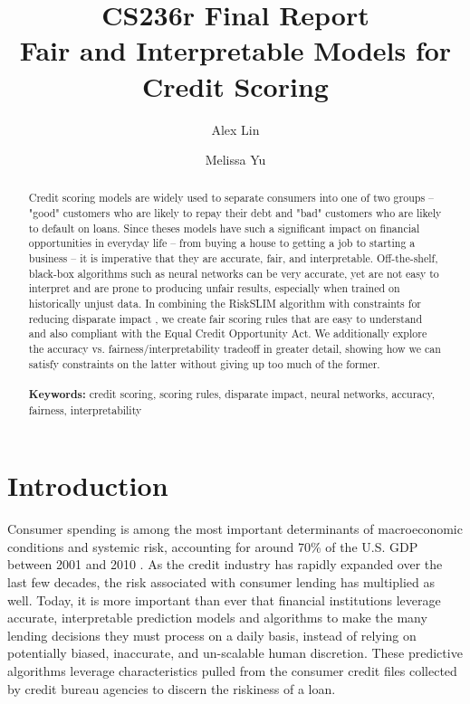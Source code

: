 \documentclass[11pt, margin=1in]{article}
\begin{document}
	
\title{CS236r Final Report \\ Fair and Interpretable Models for Credit Scoring}
\author{Alex Lin \and Melissa Yu}
\date{}
\maketitle

\begin{abstract}
Credit scoring models are widely used to separate consumers into one of two groups -- "good" customers who are likely to repay their debt and "bad" customers who are likely to default on loans.  Since theses models have such a significant impact on financial opportunities in everyday life -- from buying a house to getting a job to starting a business -- it is imperative that they are accurate, fair, and interpretable.  Off-the-shelf, black-box algorithms such as neural networks can be very accurate, yet are not easy to interpret and are prone to producing unfair results, especially when trained on historically unjust data.  In combining the RiskSLIM algorithm \cite{risk-slim} with constraints for reducing disparate impact \cite{disparate-impact}, we create fair scoring rules that are easy to understand and also compliant with the Equal Credit Opportunity Act.  We additionally explore the accuracy vs. fairness/interpretability tradeoff in greater detail, showing how we can satisfy constraints on the latter without giving up too much of the former. \\ \\  
\textbf{Keywords:} credit scoring, scoring rules, disparate impact, neural networks, accuracy, fairness, interpretability
\end{abstract}

\section{Introduction}
Consumer spending is among the most important determinants of macroeconomic conditions and systemic risk, accounting for around 70\% of the U.S. GDP between 2001 and 2010 \cite{ml-for-risk}. As the credit industry has rapidly expanded over the last few decades, the risk associated with consumer lending has multiplied as well. Today, it is more important than ever that financial institutions leverage accurate, interpretable prediction models and algorithms to make the many lending decisions they must process on a daily basis, instead of relying on potentially biased, inaccurate, and un-scalable human discretion. These predictive algorithms leverage characteristics pulled from the consumer credit files collected by credit bureau agencies to discern the riskiness of a loan.
\end{document}
